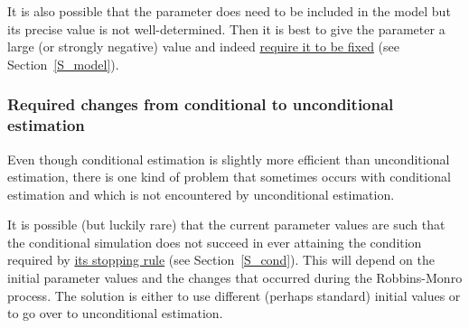 \documentclass[a4paper,fleqn,11pt]{article}
\newcommand{\+}{\, + \,}
\begin{document}
It is also possible that the parameter does need to be included in
the model but its precise value is not well-determined. Then it is
best to give the parameter a large (or strongly negative) value
and indeed
\hyperlink{T_fix}{require it to be fixed}
(see Section~\ref{S_model}).


\subsubsection{Required changes from conditional to unconditional estimation}

Even though conditional estimation is slightly more efficient than
unconditional estimation, there is one kind of problem that
sometimes occurs with conditional estimation and which is not
encountered by unconditional estimation.

It is possible (but luckily rare) that the current parameter
values are such that the conditional
simulation does not succeed in ever attaining the condition required
by \hyperlink{T_distance_stop}{its stopping rule} (see
Section~\ref{S_cond}).
This will depend on the initial parameter values
and the changes that occurred during the Robbins-Monro process.
The solution is either to use different
(perhaps standard) initial values or to go over to
unconditional estimation.
\end{document}
